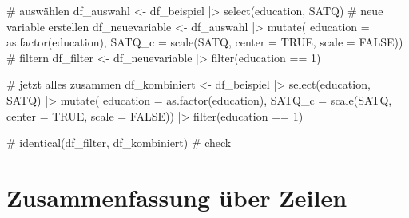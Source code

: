 \documentclass[
  letterpaper,
  DIV=11,
  numbers=noendperiod]{scrreprt}
\newenvironment{Shaded}{\begin{snugshade}}{\end{snugshade}}
\newcommand{\AttributeTok}[1]{\textcolor[rgb]{0.40,0.45,0.13}{#1}}
\newcommand{\CommentTok}[1]{\textcolor[rgb]{0.37,0.37,0.37}{#1}}
\newcommand{\ConstantTok}[1]{\textcolor[rgb]{0.56,0.35,0.01}{#1}}
\newcommand{\DecValTok}[1]{\textcolor[rgb]{0.68,0.00,0.00}{#1}}
\newcommand{\FunctionTok}[1]{\textcolor[rgb]{0.28,0.35,0.67}{#1}}
\newcommand{\NormalTok}[1]{\textcolor[rgb]{0.00,0.23,0.31}{#1}}
\newcommand{\OtherTok}[1]{\textcolor[rgb]{0.00,0.23,0.31}{#1}}
\newcommand{\SpecialCharTok}[1]{\textcolor[rgb]{0.37,0.37,0.37}{#1}}
\begin{document}
\begin{tcolorbox}[enhanced jigsaw, toprule=.15mm, breakable, arc=.35mm, opacitybacktitle=0.6, titlerule=0mm, rightrule=.15mm, title=\textcolor{quarto-callout-tip-color}{\faLightbulb}\hspace{0.5em}{Lösung: Übung Data Wrangling}, colbacktitle=quarto-callout-tip-color!10!white, coltitle=black, bottomrule=.15mm, colframe=quarto-callout-tip-color-frame, bottomtitle=1mm, toptitle=1mm, leftrule=.75mm, left=2mm, opacityback=0, colback=white]

\begin{Shaded}
\begin{Highlighting}[]
\CommentTok{\# auswählen}
\NormalTok{df\_auswahl }\OtherTok{\textless{}{-}}\NormalTok{ df\_beispiel }\SpecialCharTok{|\textgreater{}} \FunctionTok{select}\NormalTok{(education, SATQ)}
\CommentTok{\# neue variable erstellen}
\NormalTok{df\_neuevariable }\OtherTok{\textless{}{-}}\NormalTok{ df\_auswahl }\SpecialCharTok{|\textgreater{}} \FunctionTok{mutate}\NormalTok{(}
  \AttributeTok{education =} \FunctionTok{as.factor}\NormalTok{(education),}
  \AttributeTok{SATQ\_c =} \FunctionTok{scale}\NormalTok{(SATQ, }\AttributeTok{center =} \ConstantTok{TRUE}\NormalTok{, }\AttributeTok{scale =} \ConstantTok{FALSE}\NormalTok{))}
\CommentTok{\# filtern}
\NormalTok{df\_filter }\OtherTok{\textless{}{-}}\NormalTok{ df\_neuevariable }\SpecialCharTok{|\textgreater{}} \FunctionTok{filter}\NormalTok{(education }\SpecialCharTok{==} \DecValTok{1}\NormalTok{)}

\CommentTok{\# jetzt alles zusammen}
\NormalTok{df\_kombiniert }\OtherTok{\textless{}{-}}\NormalTok{ df\_beispiel }\SpecialCharTok{|\textgreater{}} 
  \FunctionTok{select}\NormalTok{(education, SATQ) }\SpecialCharTok{|\textgreater{}} 
  \FunctionTok{mutate}\NormalTok{(}
  \AttributeTok{education =} \FunctionTok{as.factor}\NormalTok{(education),}
  \AttributeTok{SATQ\_c =} \FunctionTok{scale}\NormalTok{(SATQ, }\AttributeTok{center =} \ConstantTok{TRUE}\NormalTok{, }\AttributeTok{scale =} \ConstantTok{FALSE}\NormalTok{)) }\SpecialCharTok{|\textgreater{}} 
  \FunctionTok{filter}\NormalTok{(education }\SpecialCharTok{==} \DecValTok{1}\NormalTok{)}

\CommentTok{\# identical(df\_filter, df\_kombiniert) \# check}
\end{Highlighting}
\end{Shaded}

\end{tcolorbox}

\section{Zusammenfassung über
Zeilen}\label{zusammenfassung-uxfcber-zeilen}
\end{document}
